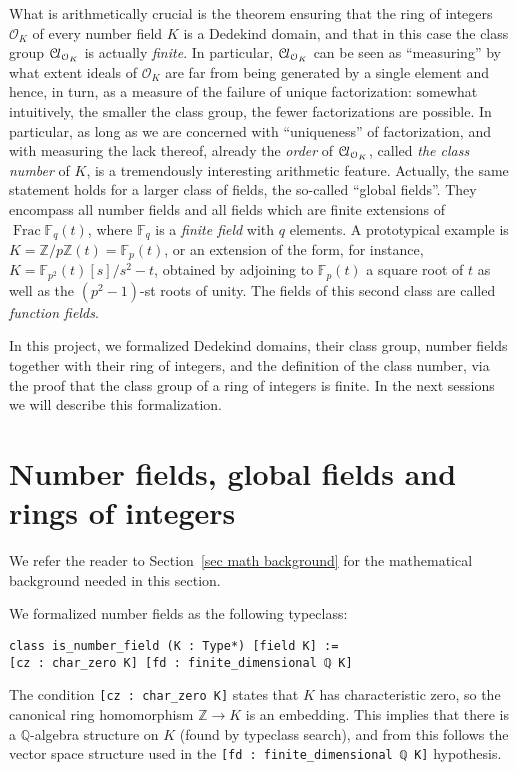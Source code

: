 \documentclass[a4paper,USenglish,cleveref, autoref, thm-restate]{lipics-v2021}
\newcommand{\lean}[1]{\texttt{#1}\xspace} %
\newcommand*{\OK}[1][K]{\mathcal{O}_{#1}}
\newcommand*{\Cl}{\mathcal{C}\kern-.075em l}
\newcommand*{\Fq}[1][q]{\mathbb{F}_{#1}}
\newcommand{\Q}{\mathbb{Q}}
\newcommand{\Z}{\mathbb{Z}}
\DeclareMathOperator{\Frac}{Frac}
\begin{document}
What is arithmetically crucial is the theorem ensuring that the ring of integers $\OK$ of every number field $K$ is a Dedekind domain, and that in this case the class group $\Cl_{\OK}$ is actually \emph{finite}. In particular, $\Cl_{\OK}$ can be seen as ``measuring'' by what extent ideals of $\OK$ are far from being generated by a single element and hence, in turn, as a measure of the failure of unique factorization: somewhat intuitively, the smaller the class group, the fewer factorizations are possible. In particular, as long as we are concerned with ``uniqueness'' of factorization, and with measuring the lack thereof, already the \emph{order} of $\Cl_{\OK}$, called \emph{the class number} of $K$, is a tremendously interesting arithmetic feature. Actually, the same statement holds for a larger class of fields, the so-called ``global fields''. They encompass all number fields and all fields which are finite extensions of $\Frac \Fq(t)$, where $\Fq$ is a \emph{finite field} with $q$ elements. A prototypical example is $K=\Z/p\Z(t)=\Fq[p](t)$, or an extension of the form, for instance, $K=\Fq[p^2](t)[s]/s^2-t$, obtained by adjoining to $\Fq[p](t)$ a square root of $t$ as well as the $(p^2-1)$-st roots of unity. The fields of this second class are called \emph{function fields}.

In this project, we formalized Dedekind domains, their class group, number fields together with their ring of integers, and the definition of the class number, via the proof that the class group of a ring of integers is finite. In the next sessions we will describe this formalization.


\section{Number fields, global fields and rings of integers}

We refer the reader to Section~\ref{sec math background} for the mathematical background needed in this section.

We formalized number fields as the following typeclass:
\begin{lstlisting}
class is_number_field (K : Type*) [field K] :=
[cz : char_zero K] [fd : finite_dimensional ℚ K]
\end{lstlisting}
The condition \lean{[cz : char\_zero K]} states that $K$ has characteristic zero, so the canonical ring homomorphism $\Z \to K$ is an embedding.
This implies that there is a $\Q$-algebra structure on $K$ (found by typeclass search),
and from this follows the vector space structure used in the \lean{[fd : finite\_dimensional ℚ K]} hypothesis.
\end{document}

